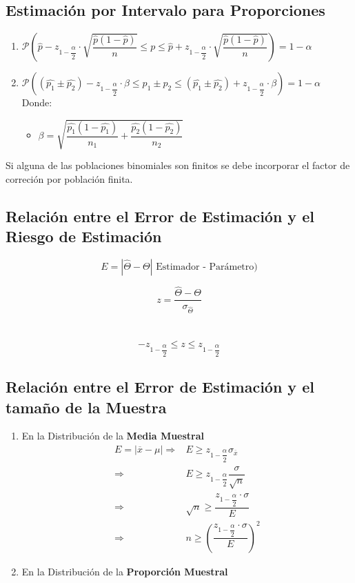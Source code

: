 \subsection{Estimación por Intervalo para Proporciones}
\begin{enumerate}[label=\textbf{(\Roman*)}]
\item $\mathcal{P}\left(\hat{p}-z_{1-\dfrac{\alpha}{2}}\cdot\sqrt{\dfrac{\hat{p}(1-\hat{p})}{n}}\leq p \leq \hat{p}+z_{1-\dfrac{\alpha}{2}}\cdot\sqrt{\dfrac{\hat{p}(1-\hat{p})}{n}}  \right)=1-\alpha$
\item $\mathcal{P}\left((\widehat{p_1}\pm\widehat{p_2})-z_{1-\dfrac{\alpha}{2}}\cdot\beta\leq p_1\pm p_2\leq (\widehat{p_1}\pm\widehat{p_2})+z_{1-\dfrac{\alpha}{2}}\cdot\beta\right)=1-\alpha$\\
 Donde:
  \begin{itemize}
  \item $\beta = \sqrt{\dfrac{\hat{p_1}(1-\hat{p_1})}{n_1}+\dfrac{\hat{p_2}(1-\hat{p_2})}{n_2}} $
   \end{itemize}
\end{enumerate}
Si alguna de las poblaciones binomiales son finitos se debe incorporar el factor de correción por población finita.
\subsection{Relación entre el Error de Estimación y el Riesgo de Estimación}
$$ E=|\widehat{\Theta}-\Theta | \text{ Estimador - Parámetro)} $$

$$z = \dfrac{\widehat{\Theta}-\Theta}{\sigma_{\widehat{\Theta}}}$$ \\{ }\\
$$ -z_{1-\dfrac{\alpha}{2}} \leq z \leq z_{1-\dfrac{\alpha}{2}} $$

\subsection{Relación entre el Error de Estimación y el tamaño de la Muestra}
\begin{enumerate}[label=\textbf{(\Roman*)}]
  \item En la Distribución de la \textbf{Media Muestral}
  \begin{align*}
  E=|\overline{x}-\mu| \Rightarrow & E\geq z_{1-\dfrac{\alpha}{2}} \sigma_{\overline{x}} \\
  			     \Rightarrow & E\geq z_{1-\dfrac{\alpha}{2}} \dfrac{\sigma}{\sqrt{n}}\\
  			     \Rightarrow & \sqrt{n}\geq  \dfrac{z_{1-\dfrac{\alpha}{2}}\cdot\sigma}{E} \\
  			     \Rightarrow & n\geq  \left(\dfrac{z_{1-\dfrac{\alpha}{2}}\cdot\sigma}{E}\right)^2
  \end{align*}
  \item En la Distribución de la \textbf{Proporción Muestral}
\end{enumerate}